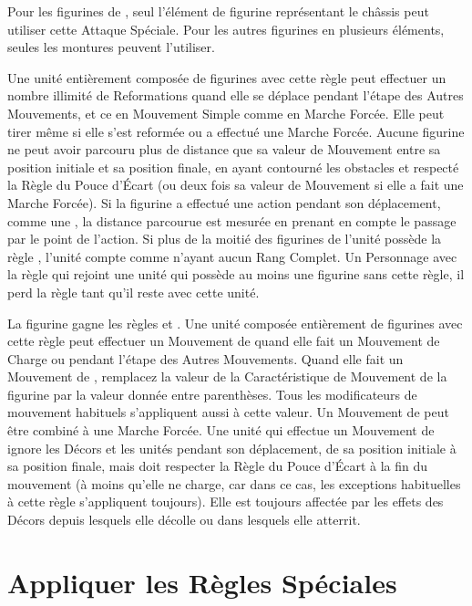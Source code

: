 Pour les figurines de \chariot{}, seul l'élément de figurine représentant le châssis peut utiliser cette Attaque Spéciale. Pour les autres figurines en plusieurs éléments, seules les montures peuvent l'utiliser.


Une unité entièrement composée de figurines avec cette règle peut effectuer un nombre illimité de Reformations quand elle se déplace pendant l'étape des Autres Mouvements, et ce en Mouvement Simple comme en Marche Forcée. Elle peut tirer même si elle s'est reformée ou a effectué une Marche Forcée. Aucune figurine ne peut avoir parcouru plus de distance que sa valeur de Mouvement entre sa position initiale et sa position finale, en ayant contourné les obstacles et respecté la Règle du Pouce d'Écart (ou deux fois sa valeur de Mouvement si elle a fait une Marche Forcée). Si la figurine a effectué une action pendant son déplacement, comme une \sweepingattack{}, la distance parcourue est mesurée en prenant en compte le passage par le point de l'action. Si plus de la moitié des figurines de l'unité possède la règle \lighttroops{}, l'unité compte comme n'ayant aucun Rang Complet. Un Personnage avec la règle \lighttroops{} qui rejoint une unité qui possède au moins une figurine sans cette règle, il perd la règle \lighttroops{} tant qu'il reste avec cette unité.


La figurine gagne les règles \swiftstride{} et \lighttroops{}. Une unité composée entièrement de figurines avec cette règle peut effectuer un Mouvement de \fly{} quand elle fait un Mouvement de Charge ou pendant l'étape des Autres Mouvements. Quand elle fait un Mouvement de \fly{}, remplacez la valeur de la Caractéristique de Mouvement de la figurine par la valeur donnée entre parenthèses. Tous les modificateurs de mouvement habituels s'appliquent aussi à cette valeur. Un Mouvement de \fly{} peut être combiné à une Marche Forcée. Une unité qui effectue un Mouvement de \fly{} ignore les Décors et les unités pendant son déplacement, de sa position initiale à sa position finale, mais doit respecter la Règle du Pouce d'Écart à la fin du mouvement (à moins qu'elle ne charge, car dans ce cas, les exceptions habituelles à cette règle s'appliquent toujours). Elle est toujours affectée par les effets des Décors depuis lesquels elle décolle ou dans lesquels elle atterrit.

\newpage
\section{Appliquer les Règles Spéciales}
\label{applying_special_rules}

